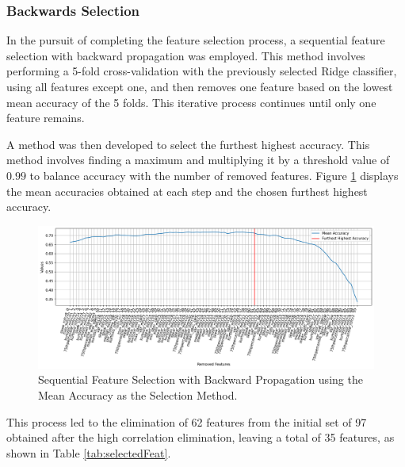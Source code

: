 \subsubsection{Backwards Selection}

In the pursuit of completing the feature selection process, a sequential feature selection with backward propagation was employed. This method involves performing a 5-fold cross-validation with the previously selected Ridge classifier, using all features except one, and then removes one feature based on the lowest mean accuracy of the 5 folds. This iterative process continues until only one feature remains.

A method was then developed to select the furthest highest accuracy. This method involves finding a maximum and multiplying it by a threshold value of $0.99$ to balance accuracy with the number of removed features. Figure \ref{fig:backProp1} displays the mean accuracies obtained at each step and the chosen furthest highest accuracy.

\begin{figure}[H]
	\centering
	\includegraphics[width=1\linewidth]{figs/4_1_traditional/backProp1.png}
	\caption{Sequential Feature Selection with Backward Propagation using the Mean Accuracy as the Selection Method.}
	\label{fig:backProp1}
\end{figure}

This process led to the elimination of 62 features from the initial set of 97 obtained after the high correlation elimination, leaving a total of 35 features, as shown in Table \ref{tab:selectedFeat}.

